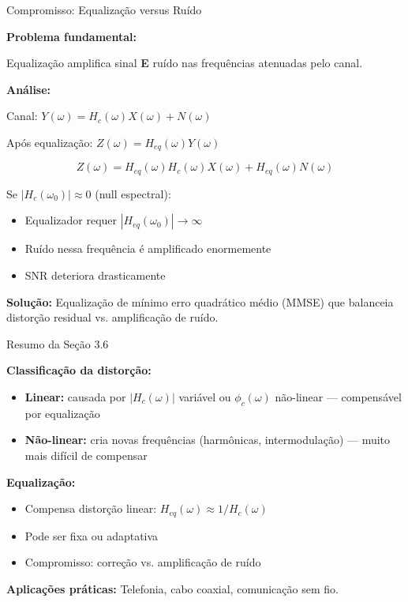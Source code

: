 \begin{frame}{Compromisso: Equalização versus Ruído}

\textbf{Problema fundamental:}

Equalização amplifica sinal \textbf{E} ruído nas frequências atenuadas pelo canal.

\textbf{Análise:}

Canal: $Y(\omega) = H_c(\omega)X(\omega) + N(\omega)$

Após equalização: $Z(\omega) = H_{eq}(\omega)Y(\omega)$

\[
Z(\omega) = H_{eq}(\omega)H_c(\omega)X(\omega) + H_{eq}(\omega)N(\omega)
\]

Se $|H_c(\omega_0)| \approx 0$ (null espectral):

\begin{itemize}
\item Equalizador requer $|H_{eq}(\omega_0)| \to \infty$
\item Ruído nessa frequência é amplificado enormemente
\item SNR deteriora drasticamente
\end{itemize}

\vspace{0.1cm}

\textbf{Solução:} Equalização de mínimo erro quadrático médio (MMSE) que balanceia distorção residual vs. amplificação de ruído.

\end{frame}


\begin{frame}{Resumo da Seção 3.6}

\textbf{Classificação da distorção:}

\begin{itemize}
\item \textbf{Linear:} causada por $|H_c(\omega)|$ variável ou $\phi_c(\omega)$ não-linear — compensável por equalização
\item \textbf{Não-linear:} cria novas frequências (harmônicas, intermodulação) — muito mais difícil de compensar
\end{itemize}

\vspace{0.2cm}

\textbf{Equalização:}

\begin{itemize}
\item Compensa distorção linear: $H_{eq}(\omega) \approx 1/H_c(\omega)$
\item Pode ser fixa ou adaptativa
\item Compromisso: correção vs. amplificação de ruído
\end{itemize}

\vspace{0.2cm}

\textbf{Aplicações práticas:} Telefonia, cabo coaxial, comunicação sem fio.

\end{frame}
